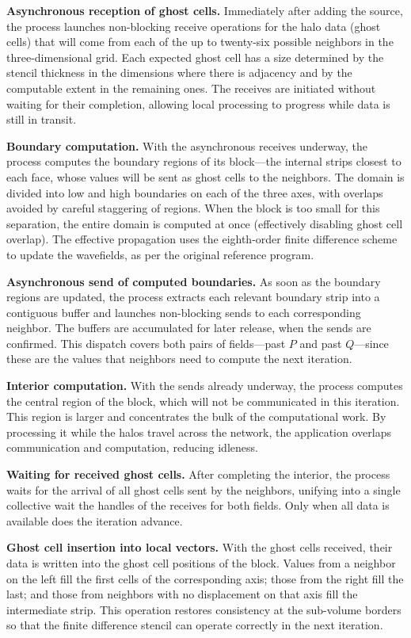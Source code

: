 \documentclass[cic,tc,english]{infufrgs}
\begin{document}
\textbf{Asynchronous reception of ghost cells.}
Immediately after adding the source, the process launches non-blocking
receive operations for the halo data (ghost cells) that will come from
each of the up to twenty-six possible neighbors in the three-dimensional
grid. Each expected ghost cell has a size determined by the stencil
thickness in the dimensions where there is adjacency and by the
computable extent in the remaining ones. The receives are initiated
without waiting for their completion, allowing local processing to
progress while data is still in transit.

\textbf{Boundary computation.}
With the asynchronous receives underway, the process computes the
boundary regions of its block---the internal strips closest to each
face, whose values will be sent as ghost cells to the neighbors. The
domain is divided into low and high boundaries on each of the three
axes, with overlaps avoided by careful staggering of regions. When the
block is too small for this separation, the entire domain is computed
at once (effectively disabling ghost cell overlap). The effective
propagation uses the eighth-order finite difference scheme to update
the wavefields, as per the original reference program.

\textbf{Asynchronous send of computed boundaries.}
As soon as the boundary regions are updated, the process extracts each
relevant boundary strip into a contiguous buffer and launches
non-blocking sends to each corresponding neighbor. The buffers are
accumulated for later release, when the sends are confirmed. This
dispatch covers both pairs of fields---past $P$ and past $Q$---since
these are the values that neighbors need to compute the next iteration.

\textbf{Interior computation.}
With the sends already underway, the process computes the central
region of the block, which will not be communicated in this iteration.
This region is larger and concentrates the bulk of the computational
work. By processing it while the halos travel across the network, the
application overlaps communication and computation, reducing idleness.

\textbf{Waiting for received ghost cells.}
After completing the interior, the process waits for the arrival of
all ghost cells sent by the neighbors, unifying into a single
collective wait the handles of the receives for both fields. Only when
all data is available does the iteration advance.

\textbf{Ghost cell insertion into local vectors.}
With the ghost cells received, their data is written into the ghost
cell positions of the block. Values from a neighbor on the left fill
the first cells of the corresponding axis; those from the right fill
the last; and those from neighbors with no displacement on that axis
fill the intermediate strip. This operation restores consistency at the
sub-volume borders so that the finite difference stencil can operate
correctly in the next iteration.
\end{document}
